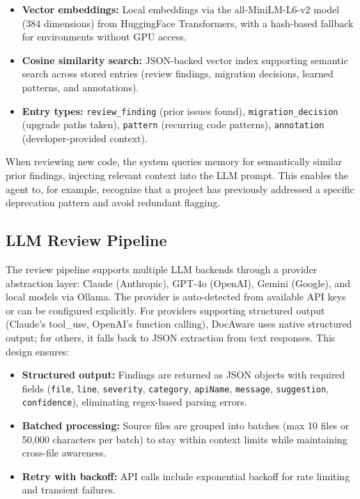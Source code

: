 \documentclass[sigconf,nonacm]{acmart}
\begin{document}
\begin{itemize}
    \item \textbf{Vector embeddings:} Local embeddings via the all-MiniLM-L6-v2 model (384 dimensions) from HuggingFace Transformers, with a hash-based fallback for environments without GPU access.
    \item \textbf{Cosine similarity search:} JSON-backed vector index supporting semantic search across stored entries (review findings, migration decisions, learned patterns, and annotations).
    \item \textbf{Entry types:} \texttt{review\_finding} (prior issues found), \texttt{migration\_decision} (upgrade paths taken), \texttt{pattern} (recurring code patterns), \texttt{annotation} (developer-provided context).
\end{itemize}

When reviewing new code, the system queries memory for semantically similar prior findings, injecting relevant context into the LLM prompt. This enables the agent to, for example, recognize that a project has previously addressed a specific deprecation pattern and avoid redundant flagging.

\subsection{LLM Review Pipeline}
\label{sec:llm-review}

The review pipeline supports multiple LLM backends through a provider abstraction layer: Claude (Anthropic), GPT-4o (OpenAI), Gemini (Google), and local models via Ollama. The provider is auto-detected from available API keys or can be configured explicitly. For providers supporting structured output (Claude's tool\_use, OpenAI's function calling), DocAware uses native structured output; for others, it falls back to JSON extraction from text responses. This design ensures:

\begin{itemize}
    \item \textbf{Structured output:} Findings are returned as JSON objects with required fields (\texttt{file}, \texttt{line}, \texttt{severity}, \texttt{category}, \texttt{apiName}, \texttt{message}, \texttt{suggestion}, \texttt{confidence}), eliminating regex-based parsing errors.
    \item \textbf{Batched processing:} Source files are grouped into batches (max 10 files or 50,000 characters per batch) to stay within context limits while maintaining cross-file awareness.
    \item \textbf{Retry with backoff:} API calls include exponential backoff for rate limiting and transient failures.
\end{itemize}
\end{document}
